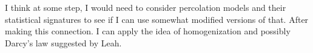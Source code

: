 \begin{observation}
	I think at some step, I would need to consider percolation models and their statistical signatures to see if I can use somewhat modified versions of that. After making this connection. I can apply the idea of homogenization and possibly Darcy's law suggested by Leah.
\end{observation}